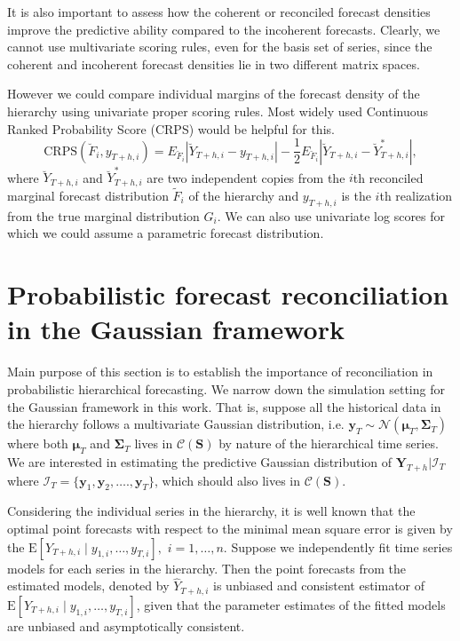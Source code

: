 \documentclass[a4paper, 11pt]{article}
\def\E{\text{E}}
\begin{document}
It is also important to assess how the coherent or reconciled forecast densities improve the predictive ability compared to the incoherent forecasts. Clearly, we cannot use multivariate scoring rules, even for the basis set of series, since the coherent and incoherent forecast densities lie in two different matrix spaces.

However we could compare individual margins of the forecast density of the hierarchy using univariate proper scoring rules. Most widely used Continuous Ranked Probability Score (CRPS) would be helpful for this.
\begin{equation} \label{eq:(3.6)}
  \text{CRPS}(\breve{F}_i,y_{T+h,i}) = E_{\breve{F}_i}|\breve{Y}_{T+h,i}-y_{T+h,i}| - \frac{1}{2}E_{\breve{F}_i}|\breve{Y}_{T+h,i}-\breve{Y}^*_{T+h,i}|,
\end{equation}
where $\breve{Y}_{T+h,i}$ and $\breve{Y}^*_{T+h,i}$ are two independent copies from the $i$th reconciled marginal forecast distribution $\tilde{F}_i$ of the hierarchy and $y_{T+h,i}$ is the $i$th realization from the true marginal distribution $G_i$. We can also use univariate log scores for which we could assume a parametric forecast distribution.

\section{Probabilistic forecast reconciliation in the Gaussian framework}

Main purpose of this section is to establish the importance of reconciliation in probabilistic hierarchical forecasting. We narrow down the simulation setting for the Gaussian framework in this work. That is, suppose all the historical data in the hierarchy follows a multivariate Gaussian distribution, i.e. $\bm{y}_T \sim \mathscr{N}(\bm{\mu}_T, \bm{\Sigma}_T)$ where both $\bm{\mu}_T$ and $\bm{\Sigma}_T$ lives in $\mathscr{C}(\bm{S})$ by nature of the hierarchical time series. We are interested in estimating the predictive Gaussian distribution of $\bm{Y}_{T+h}| \bm{\mathcal{I}}_T$ where $\bm{\mathcal{I}}_T= \{\bm{y}_1,\bm{y}_2,\dots.,\bm{y}_T\}$, which should also lives in $\mathscr{C}(\bm{S})$.

Considering the individual series in the hierarchy, it is well known that the optimal point forecasts with respect to the minimal mean square error is given by the $\E[Y_{T+h,i}\mid y_{1,i},\dots,y_{T,i}],$ $i=1,\dots,n$. Suppose we independently fit time series models for each series in the hierarchy. Then the point forecasts from the estimated models, denoted by $\hat{Y}_{T+h,i}$ is unbiased and consistent estimator of $\E[Y_{T+h,i}\mid y_{1,i},\dots,y_{T,i}]$, given that the parameter estimates of the fitted models are unbiased and asymptotically consistent.
\end{document}
